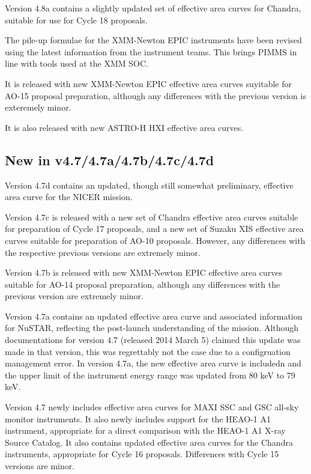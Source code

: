 \documentclass[11pt]{article}
\begin{document}
Version 4.8a contains a slightly updated set of effective area curves
for Chandra, suitable for use for Cycle 18 proposals.

The pile-up formulae for the XMM-Newton EPIC instruments have been revised
using the latest information from the instrument teams. This brings PIMMS
in line with tools used at the XMM SOC.

It is released with new XMM-Newton EPIC effective area curves suyitable
for AO-15 proposal preparation, although any differences with the previous
version is exteremely minor.

It is also released with new ASTRO-H HXI effective area curves.

\subsection{New in v4.7/4.7a/4.7b/4.7c/4.7d}

Version 4.7d contains an updated, though still somewhat preliminary,
effective area curve for the NICER mission.

Version 4.7c is released with a new set of Chandra effective area curves
suitable for preparation of Cycle 17 proposals, and a new set of Suzaku
XIS effective area curves suitable for preparation of AO-10 proposals.
However, any differences with the respective previous versions are
extremely minor.

Version 4.7b is released with new XMM-Newton EPIC effective area curves
suitable for AO-14 proposal preparation, although any differences with
the previous version are extremely minor.

Version 4.7a contains an updated effective area curve and associated
information for NuSTAR, reflecting the post-launch understanding of the
mission.  Although documentations for version 4.7 (released 2014 March 5)
claimed this update was made in that version, this was regrettably not
the case due to a configruation management error. In version 4.7a, the
new effective area curve is includedn and the upper limit of the instrument
energy range was updated from 80 keV to 79 keV.

Version 4.7 newly includes effective area curves for MAXI SSC and GSC
all-sky monitor instruments. It also newly includes support for the HEAO-1
A1 instrument, appropriate for a direct comparison with the HEAO-1 A1 X-ray
Source Catalog. It also contains updated effective area curves for the Chandra
instruments, appropriate for Cycle 16 proposals.  Differences with Cycle 15
versions are minor.
\end{document}
